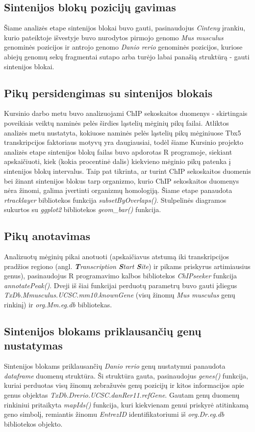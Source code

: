 \documentclass[12pt]{article}
\begin{document}
\subsection{Sintenijos blokų pozicijų gavimas}
Šiame analizės etape sintenijos blokai buvo gauti, pasinaudojus \emph{Cinteny}
įrankiu, kurio pateiktoje išvestyje buvo nurodytos pirmojo genomo
\emph{Mus musculus} genominės pozicijos ir antrojo genomo \emph{Danio rerio}
genominės pozicijos, kuriose abiejų genomų sekų fragmentai sutapo arba turėjo
labai panašią struktūrą - gauti sintenijos blokai.

\subsection{Pikų persidengimas su sintenijos blokais}
Kursinio darbo metu buvo analizuojami ChIP sekoskaitos duomenys - skirtingais
poveikiais veiktų naminės pelės širdies ląstelių mėginių pikų failai. Atliktos
analizės metu nustatyta, kokiuose naminės pelės ląstelių pikų mėginiuose Tbx5
transkripcijos faktoriaus motyvų yra daugiausiai, todėl šiame Kursinio projekto
analizės etape sintenijos blokų failas buvo apdorotas R programoje, siekiant
apskaičiuoti, kiek (kokia procentinė dalis) kiekvieno mėginio pikų patenka į
sintenijos blokų intervalus. Taip pat tikrinta, ar turint ChIP sekoskaitos
duomenis bei žinant sintenijos blokus tarp organizmo, kurio ChIP sekoskaitos
duomenys nėra žinomi, galima įvertinti organizmų homologiją. Šiame etape
panaudota \emph{rtracklayer}\cite{R_TRACK} bibliotekos funkcija
\emph{subsetByOverlaps()}. Stulpelinės diagramos sukurtos su
\emph{ggplot2}\cite{R_GGPLOT} bibliotekos \emph{geom\_bar()} funkcija.

\subsection{Pikų anotavimas}
Analizuotų mėginių pikai anotuoti (apskaičiavus atstumą iki transkripcijos
pradžios regiono (angl. \emph{\textbf{T}ranscription \textbf{S}tart
\textbf{S}ite}) ir pikams priskyrus artimiausius genus), pasinaudojus R
programavimo kalbos bibliotekos \emph{ChIPseeker}\cite{CHIP} funkcija
\emph{annotatePeak()}. Dveji iš šiai funkcijai perduotų parametrų buvo gauti
įdiegus \emph{TxDb.Mmusculus.UCSC.mm10.knownGene}\cite{KNOWN_GENE} (visų žinomų
\emph{Mus musculus} genų rinkinį) ir \emph{org.Mm.eg.db}\cite{MM_ANNOT}
bibliotekas.

\subsection{Sintenijos blokams priklausančių genų nustatymas}
Sintenijos blokams priklausančių \emph{Danio rerio} genų nustatymui panaudota
\emph{dataframe} duomenų struktūra. Ši struktūra gauta, pasinaudojus
\emph{genes()} funkcija, kuriai perduotas visų žinomų zebražuvės genų pozicijų
ir kitos informacijos apie genus objektas
\emph{TxDb.Drerio.UCSC.danRer11.\-refGene}\cite{REF_GENE}. Gautam genų duomenų
rinkiniui pritaikyta \emph{mapIds()} funkcija, kuri kiekvienam genui priskyrė
atitinkamą geno simbolį, remiantis žinomu \emph{EntrezID} identifikatoriumi iš
\emph{org.Dr.eg.db}\cite{DR_ANNOT} bibliotekos objekto.
\end{document}
